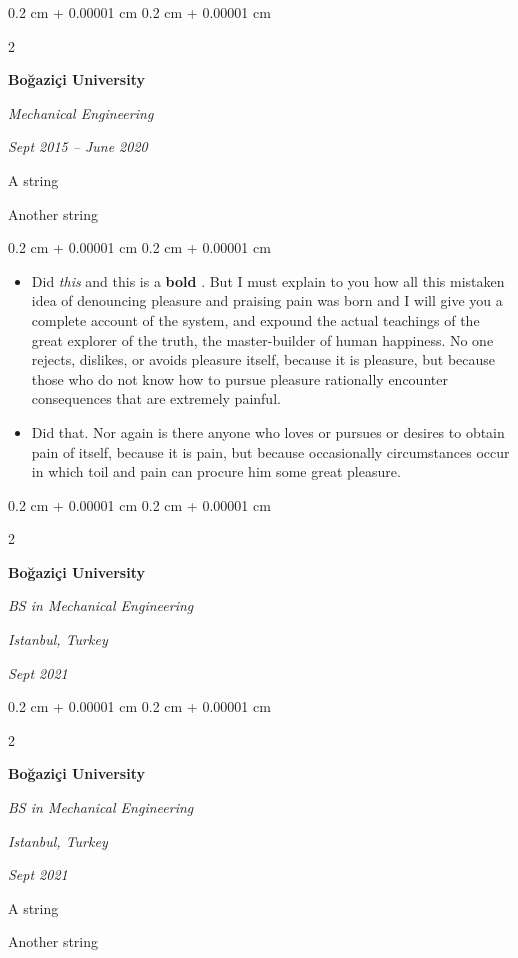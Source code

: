 \documentclass[10pt, letterpaper]{article}
\newenvironment{summary}{
    \begin{description}[
        topsep=0.10 cm,
        parsep=0.10 cm,
        partopsep=0pt,
        itemsep=0pt,
        leftmargin=0.4 cm + 10pt
    ]
}{
    \end{description}
} %
\newenvironment{highlights}{
    \begin{itemize}[
        topsep=0.10 cm,
        parsep=0.10 cm,
        partopsep=0pt,
        itemsep=0pt,
        leftmargin=0.4 cm + 10pt
    ]
}{
    \end{itemize}
} %
\newenvironment{onecolentry}{
    \begin{adjustwidth}{
        0.2 cm + 0.00001 cm
    }{
        0.2 cm + 0.00001 cm
    }
}{
    \end{adjustwidth}
} %
\newenvironment{twocolentry}[2][]{
    \onecolentry
    \def\secondColumn{#2}
    \setcolumnwidth{\fill, 4.5 cm}
    \begin{paracol}{2}
}{
    \switchcolumn \raggedleft \secondColumn
    \end{paracol}
    \endonecolentry
} %
\let\hrefWithoutArrow\href
\renewcommand{\href}[2]{\hrefWithoutArrow{#1}{\ifthenelse{\equal{#2}{}}{ }{#2 }\raisebox{.15ex}{\footnotesize \faExternalLink*}}}
\begin{document}
        \begin{twocolentry}{
            
            
        \textit{Sept 2015 – June 2020}}
            \textbf{Boğaziçi University}

            \textit{Mechanical Engineering}
        \end{twocolentry}
            \begin{summary}
                \item A string
                \item Another string
            \end{summary}
        \vspace{0.10 cm}
        \begin{onecolentry}
            \begin{highlights}
                \item Did \textit{this} and this is a \textbf{bold} \href{https://example.com}{link}. But I must explain to you how all this mistaken idea of denouncing pleasure and praising pain was born and I will give you a complete account of the system, and expound the actual teachings of the great explorer of the truth, the master-builder of human happiness. No one rejects, dislikes, or avoids pleasure itself, because it is pleasure, but because those who do not know how to pursue pleasure rationally encounter consequences that are extremely painful.
                \item Did that. Nor again is there anyone who loves or pursues or desires to obtain pain of itself, because it is pain, but because occasionally circumstances occur in which toil and pain can procure him some great pleasure.
            \end{highlights}
        \end{onecolentry}


        \vspace{0.2 cm}

        \begin{twocolentry}{
        \textit{Istanbul, Turkey}    
            
        \textit{Sept 2021}}
            \textbf{Boğaziçi University}

            \textit{BS in Mechanical Engineering}
        \end{twocolentry}


        \vspace{0.2 cm}

        \begin{twocolentry}{
        \textit{Istanbul, Turkey}    
            
        \textit{Sept 2021}}
            \textbf{Boğaziçi University}

            \textit{BS in Mechanical Engineering}
        \end{twocolentry}
            \begin{summary}
                \item A string
                \item Another string
            \end{summary}
\end{document}
